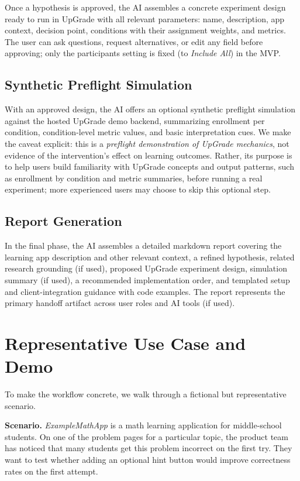 \documentclass[manuscript,screen]{acmart}
\begin{document}
Once a hypothesis is approved, the AI assembles a concrete experiment design ready to run in UpGrade with all relevant parameters: name, description, app context, decision point, conditions with their assignment weights, and metrics. The user can ask questions, request alternatives, or edit any field before approving; only the participants setting is fixed (to \emph{Include All}) in the MVP.

\subsection{Synthetic Preflight Simulation}

With an approved design, the AI offers an optional synthetic preflight simulation against the hosted UpGrade demo backend, summarizing enrollment per condition, condition-level metric values, and basic interpretation cues. We make the caveat explicit: this is a \emph{preflight demonstration of UpGrade mechanics}, not evidence of the intervention's effect on learning outcomes. Rather, its purpose is to help users build familiarity with UpGrade concepts and output patterns, such as enrollment by condition and metric summaries, before running a real experiment; more experienced users may choose to skip this optional step.

\subsection{Report Generation}

In the final phase, the AI assembles a detailed markdown report covering the learning app description and other relevant context, a refined hypothesis, related research grounding (if used), proposed UpGrade experiment design, simulation summary (if used), a recommended implementation order, and templated setup and client-integration guidance with code examples. The report represents the primary handoff artifact across user roles and AI tools (if used). 

\section{Representative Use Case and Demo}

To make the workflow concrete, we walk through a fictional but representative scenario.

\textbf{Scenario.} \emph{ExampleMathApp} is a math learning application for middle-school students. On one of the problem pages for a particular topic, the product team has noticed that many students get this problem incorrect on the first try. They want to test whether adding an optional hint button would improve correctness rates on the first attempt.
\end{document}
